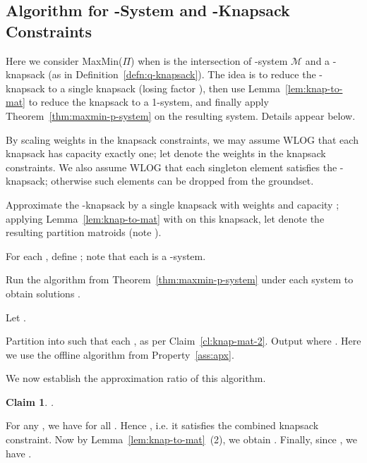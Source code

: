 \documentclass[11pt,letterpaper]{article}
\newtheorem{claim}[theorem]{Claim}
\newenvironment{proof}{

\noindent{\bf Proof:}} {\hfill


}
\def\ms{\ensuremath{\mathcal{M}}\xspace}
\def\cov{\ensuremath{\Pi}\xspace}
\def\mmp{{\sf MaxMin(\cov)}\xspace}
\newcounter{note}[section]
\begin{document}
\subsection{Algorithm for -System and -Knapsack Constraints}\label{subsec:mm-knap-psystem}
Here we consider \mmp when  is the intersection of -system \ms and a -knapsack (as in
Definition~\ref{defn:q-knapsack}). The idea is to reduce the -knapsack to a single knapsack (losing factor ), then use Lemma~\ref{lem:knap-to-mat} to reduce the knapsack to a 1-system, and finally apply
Theorem~\ref{thm:maxmin-p-system} on the resulting  system. Details appear below.

By scaling weights in the knapsack constraints, we may assume WLOG that each knapsack has capacity exactly one; let
 denote the weights in the  knapsack constraints. We also assume WLOG that each singleton element
satisfies the -knapsack; otherwise such elements can be dropped from the groundset.

\begin{algorithm}
\caption{Algorithm for \mmp under -system and -knapsack}
  \begin{algorithmic}[1]
  \STATE Approximate the -knapsack by a single knapsack with weights  and capacity ; applying
  Lemma~\ref{lem:knap-to-mat} with  on this knapsack, let  denote the resulting partition matroids (note ).

 \STATE For each , define ; note that each  is a -system.

 \STATE Run the algorithm from Theorem~\ref{thm:maxmin-p-system} under each  system  to obtain
solutions .

 \STATE Let .

 \STATE Partition  into  such that each , as per Claim~\ref{cl:knap-mat-2}.
 \STATE Output  where . Here we use
 the offline algorithm from Property~\ref{ass:apx}.
\end{algorithmic}
\end{algorithm}

We now establish the approximation ratio of this algorithm.

\begin{claim}\label{cl:knap-mat-1}
.
\end{claim}
\begin{proof}
For any , we have  for all . Hence  , i.e. it satisfies the combined knapsack constraint. Now by Lemma~\ref{lem:knap-to-mat}~(2),
we obtain . Finally, since , we have  .
\end{proof}
\end{document}
